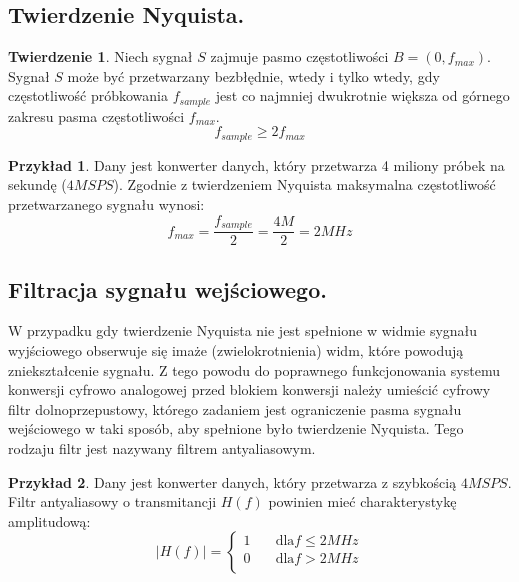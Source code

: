 \documentclass[10pt,a4paper]{report}
\theoremstyle{definition}
\theoremstyle{definition}
\theoremstyle{definition}
\newtheorem{przyklad}{Przykład}[section]
\theoremstyle{definition}
\newtheorem{twierdzenie}{Twierdzenie}[section]
\theoremstyle{definition}
\begin{document}
	\subsection{Twierdzenie Nyquista.}
	
	\begin{twierdzenie}{Niech sygnał $S$ zajmuje pasmo częstotliwości $B =\left(0, f_{max}\right) $. Sygnał $S$ może być przetwarzany bezbłędnie, wtedy i tylko wtedy, gdy częstotliwość próbkowania $f_{sample}$ jest co najmniej dwukrotnie większa od górnego zakresu pasma częstotliwości $f_{max}$. }
	$$
		f_{sample} \ge 2 f_{max}
	$$
	\end{twierdzenie}
	
	\begin{przyklad}{Dany jest konwerter danych, który przetwarza 4 miliony próbek na sekundę ($4MSPS$). Zgodnie z twierdzeniem Nyquista maksymalna częstotliwość przetwarzanego sygnału wynosi:}
		\begin{equation}
			f_{max} = \frac{f_{sample}}{2} = \frac{4M}{2} = 2MHz
		\end{equation}
	\end{przyklad}
	
	\subsection{Filtracja sygnału wejściowego.}
	{	W przypadku gdy twierdzenie Nyquista nie jest spełnione w widmie sygnału wyjściowego obserwuje się imaże (zwielokrotnienia) widm, które powodują zniekształcenie sygnału. Z tego powodu do poprawnego funkcjonowania systemu konwersji cyfrowo analogowej przed blokiem konwersji należy umieścić cyfrowy filtr dolnoprzepustowy, którego zadaniem jest ograniczenie pasma sygnału wejściowego w taki sposób, aby spełnione było twierdzenie Nyquista. Tego rodzaju filtr jest nazywany filtrem antyaliasowym. }
	
	\begin{przyklad}{Dany jest konwerter danych, który przetwarza z szybkością $4MSPS$. Filtr antyaliasowy o transmitancji $H(f)$ powinien mieć charakterystykę amplitudową:}
		\[   
		|H(f)| = 
		\begin{cases}
			1 &\quad \text{dla} f \le 2MHz\\
			0 &\quad \text{dla} f>2MHz\\
		\end{cases}
		\]		
	\end{przyklad}
	\begin{figure}[!htb]
	\centering
	\end{figure}
		
\end{document}
